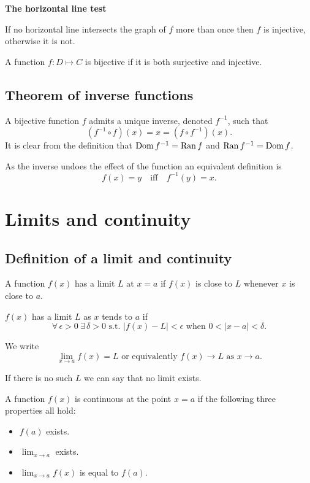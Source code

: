 \documentclass[10pt, a4paper]{article}
\begin{document}
\textbf{The horizontal line test}

If no horizontal line intersects the graph of $f$ more than once then $f$ is injective, otherwise it is not.

\begin{definition}
    A function $f : D \mapsto C$ is bijective if it is both surjective and injective.
\end{definition}

\subsection{Theorem of inverse functions}
A bijective function $f$ admits a unique inverse, denoted $f ^ {-1}$, such that
\[
(f ^ {-1} \circ f)(x) = x = (f \circ f ^ {-1})(x).
\]
It is clear from the definition that $\operatorname{Dom} f^{-1} = \operatorname{Ran} f$ and $\operatorname{Ran} f^{-1} = \operatorname{Dom} f$.

As the inverse undoes the effect of the function an equivalent definition is
\[
f(x) = y\quad\text{iff}\quad f^{-1}(y) = x.
\]

\newpage

\section{Limits and continuity}

\subsection{Definition of a limit and continuity}
A function $f(x)$ has a limit $L$ at $x = a$ if $f(x)$ is close to $L$ whenever $x$ is close to $a$.

\begin{definition}
    $f(x)$ has a limit $L$ as $x$ tends to $a$ if
    \[
    \forall\,\epsilon > 0\ \exists\,\delta > 0 \text{ s.t. } |f(x) - L| < \epsilon \text{ when } 0 < |x - a| < \delta.
    \]    
\end{definition}

We write
\[
\lim_{x \rightarrow a}f(x) = L\text{ or equivalently } f(x)\rightarrow L \text{ as } x \rightarrow a.
\]

If there is no such $L$ we can say that no limit exists.

\begin{definition}
    A function $f(x)$ is continuous at the point $x = a$ if the following three properties all hold:
    \begin{itemize}
        \item $f(a)$ exists.
        \item $\lim_{x \rightarrow a}$ exists.
        \item $\lim_{x \rightarrow a}f(x)$ is equal to $f(a)$.
    \end{itemize}
\end{definition}
\end{document}
